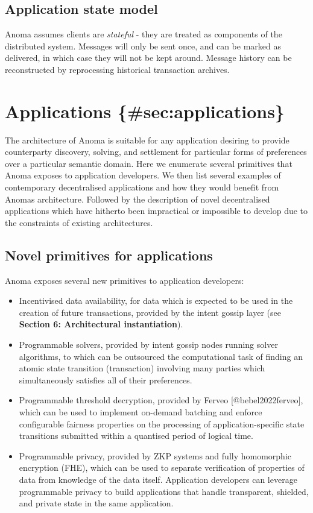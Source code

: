 \subsection{Application state model}\label{application-state-model}

Anoma assumes clients are \emph{stateful} - they are treated as
components of the distributed system. Messages will only be sent once,
and can be marked as delivered, in which case they will not be kept
around. Message history can be reconstructed by reprocessing historical
transaction archives.

\section{Applications
\{\#sec:applications\}}\label{applications-secapplications}

The architecture of Anoma is suitable for any application desiring to
provide counterparty discovery, solving, and settlement for particular
forms of preferences over a particular semantic domain. Here we
enumerate several primitives that Anoma exposes to application
developers. We then list several examples of contemporary decentralised
applications and how they would benefit from Anoma\textquotesingle s
architecture. Followed by the description of novel decentralised
applications which have hitherto been impractical or impossible to
develop due to the constraints of existing architectures.

\subsection{Novel primitives for
applications}\label{novel-primitives-for-applications}

Anoma exposes several new primitives to application developers:

\begin{itemize}
\tightlist
\item
  Incentivised data availability, for data which is expected to be used
  in the creation of future transactions, provided by the intent gossip
  layer (see \textbf{Section 6: Architectural instantiation}).
\item
  Programmable solvers, provided by intent gossip nodes running solver
  algorithms, to which can be outsourced the computational task of
  finding an atomic state transition (transaction) involving many
  parties which simultaneously satisfies all of their preferences.
\item
  Programmable threshold decryption, provided by Ferveo
  {[}@bebel2022ferveo{]}, which can be used to implement on-demand
  batching and enforce configurable fairness properties on the
  processing of application-specific state transitions submitted within
  a quantised period of logical time.
\item
  Programmable privacy, provided by ZKP systems and fully homomorphic
  encryption (FHE), which can be used to separate verification of
  properties of data from knowledge of the data itself. Application
  developers can leverage programmable privacy to build applications
  that handle transparent, shielded, and private state in the same
  application.
\end{itemize}

